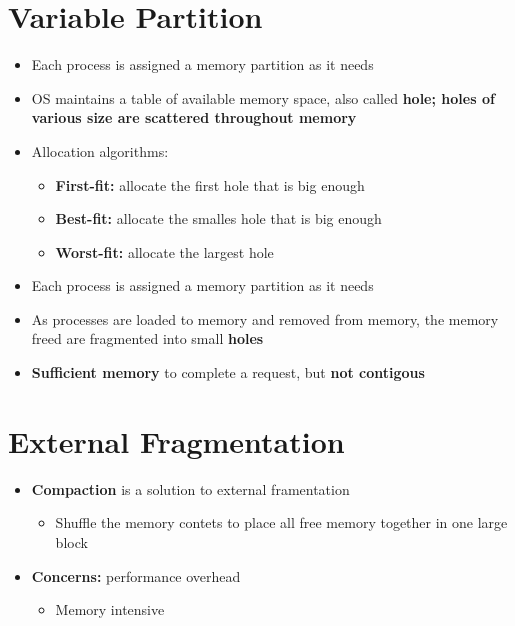 \documentclass[a4paper,11pt,english]{article}
\begin{document}
\section*{Variable Partition}
\begin{itemize}
    \item Each process is assigned a memory partition as it needs
    \item OS maintains a table of available memory space, also called \textbf{\color{blue} hole; holes of various size are scattered throughout memory}
    \item Allocation algorithms:
        \begin{itemize}
            \item \textbf{\color{blue} First-fit:} allocate the first hole that is big enough
            \item \textbf{\color{blue} Best-fit:} allocate the smalles hole that is big enough
            \item \textbf{\color{blue} Worst-fit:} allocate the largest hole
        \end{itemize}
    \item Each process is assigned a memory partition as it needs
    \item As processes are loaded to memory and removed from memory, the memory freed are fragmented into small \textbf{\color{red} holes}
    \item \textbf{\color{blue} Sufficient memory} to complete a request, but \textbf{\color{blue} not contigous}
\end{itemize}

\section*{External Fragmentation}
\begin{itemize}
    \item \textbf{\color{blue} Compaction} is a solution to external framentation
        \begin{itemize}
            \item Shuffle the memory contets to place all free memory together in one large block
        \end{itemize}
    \item \textbf{\color{blue} Concerns:} performance overhead
        \begin{itemize}
            \item Memory intensive
        \end{itemize}
\end{itemize}
\end{document}
